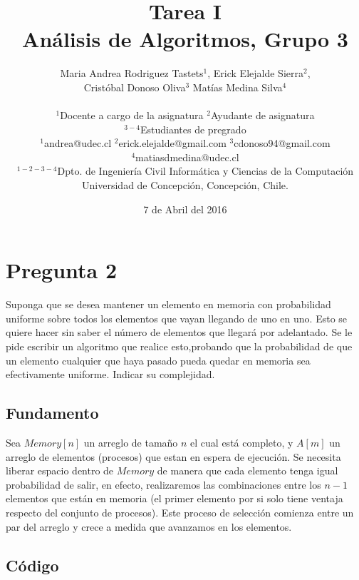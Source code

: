 \documentclass[11pt]{article}
\title{Tarea I\\ \small{Análisis de Algoritmos, Grupo 3}}
\author{
Maria Andrea Rodriguez Tastets$^{1}$, Erick Elejalde Sierra$^{2}$,\\ Cristóbal Donoso Oliva$^{3}$ Matías Medina Silva$^{4}$\\\\
\small{$^{1}$Docente a cargo de la asignatura $^{2}$Ayudante de asignatura}\\
\small{$^{3-4}$Estudiantes de pregrado}\\
\small{$^{1}$andrea@udec.cl $^{2}$erick.elejalde@gmail.com $^{3}$cdonoso94@gmail.com }\\
\small{$^{4}$matiasdmedina@udec.cl}\\
\small{$^{1-2-3-4}$Dpto. de Ingeniería Civil Informática y Ciencias de la Computación}\\
\small{Universidad de Concepción, Concepción, Chile.}\\
}
\date{7 de Abril del 2016}
\begin{document}
\maketitle

\section{Pregunta 2}
Suponga que se desea mantener un elemento en memoria con probabilidad uniforme sobre todos los elementos que vayan llegando de uno en uno. Esto se quiere hacer sin saber el número de elementos que llegará por adelantado. Se le pide escribir un algoritmo que realice esto,probando que la probabilidad de que un elemento cualquier que haya pasado pueda quedar en memoria sea efectivamente uniforme. Indicar su complejidad.\\
\subsection{Fundamento}
Sea $Memory[n]$ un arreglo de tamaño $n$ el cual está completo, y $A[m]$ un arreglo de elementos (procesos) que estan en espera de ejecución. Se necesita liberar espacio dentro de $Memory$ de manera que cada elemento tenga igual probabilidad de salir, en efecto, realizaremos las combinaciones entre los $n-1$ elementos que están en memoria (el primer elemento por si solo tiene ventaja respecto del conjunto de procesos). Este proceso de selección comienza entre un par del arreglo y crece a medida que avanzamos en los elementos.

\subsection{Código}  
\end{document}
